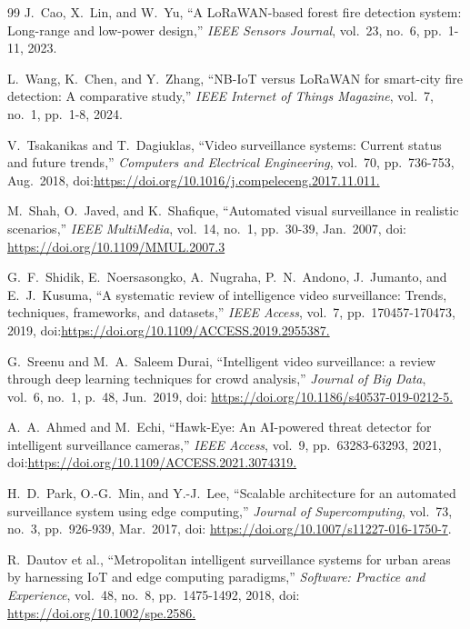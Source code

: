 \begin{thebibliography}{99}
J.~Cao, X.~Lin, and W.~Yu, ``A LoRaWAN-based forest fire detection system: Long-range and low-power design,''
\textit{IEEE Sensors Journal}, vol.~23, no.~6, pp.~1-11, 2023.

L.~Wang, K.~Chen, and Y.~Zhang, ``NB-IoT versus LoRaWAN for smart-city fire detection: A comparative study,''
\textit{IEEE Internet of Things Magazine}, vol.~7, no.~1, pp.~1-8, 2024.

V.~Tsakanikas and T.~Dagiuklas, ``Video surveillance systems: Current status and future trends,''
\textit{Computers and Electrical Engineering}, vol.~70, pp.~736-753, Aug.~2018,
doi:\url{https://doi.org/10.1016/j.compeleceng.2017.11.011.}

M.~Shah, O.~Javed, and K.~Shafique, ``Automated visual surveillance in realistic scenarios,''
\textit{IEEE MultiMedia}, vol.~14, no.~1, pp.~30-39, Jan.~2007,
doi: \url{https://doi.org/10.1109/MMUL.2007.3}

G.~F.~Shidik, E.~Noersasongko, A.~Nugraha, P.~N.~Andono, J.~Jumanto, and E.~J.~Kusuma, ``A systematic review of intelligence video surveillance: Trends, techniques, frameworks, and datasets,''
\textit{IEEE Access}, vol.~7, pp.~170457-170473, 2019,
doi:\url{https://doi.org/10.1109/ACCESS.2019.2955387.}

G.~Sreenu and M.~A.~Saleem Durai, ``Intelligent video surveillance: a review through deep learning techniques for crowd analysis,''
\textit{Journal of Big Data}, vol.~6, no.~1, p.~48, Jun.~2019,
doi: \url{https://doi.org/10.1186/s40537-019-0212-5.}

A.~A.~Ahmed and M.~Echi, ``Hawk-Eye: An AI-powered threat detector for intelligent surveillance cameras,''
\textit{IEEE Access}, vol.~9, pp.~63283-63293, 2021,
doi:\url{https://doi.org/10.1109/ACCESS.2021.3074319.}

H.~D.~Park, O.-G.~Min, and Y.-J.~Lee, ``Scalable architecture for an automated surveillance system using edge computing,''
\textit{Journal of Supercomputing}, vol.~73, no.~3, pp.~926-939, Mar.~2017,
doi: \url{https://doi.org/10.1007/s11227-016-1750-7}.

R.~Dautov et al., ``Metropolitan intelligent surveillance systems for urban areas by harnessing IoT and edge computing paradigms,''
\textit{Software: Practice and Experience}, vol.~48, no.~8, pp.~1475-1492, 2018,
doi: \url{https://doi.org/10.1002/spe.2586.}


\end{thebibliography}
